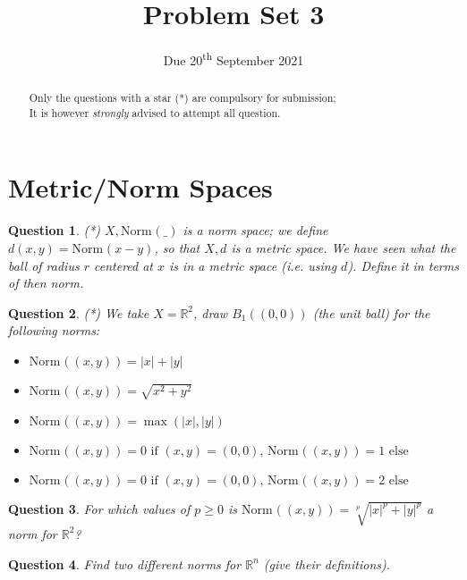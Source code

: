 \documentclass[]{article}
\title{Problem Set 3}
\author{}
\date{Due 20\textsuperscript{th} September 2021}
\newtheorem{question}{Question}
\newcommand{\R}{\mathbb{R}}
\newcommand{\norm}[2][]{\text{Norm}_{#1}(#2)}
\newcommand{\abs}[1]{| #1 |}
\begin{document}
\maketitle

\begin{abstract}
	Only the questions with a star (*) are compulsory for submission;\\
	It is however \textit{strongly} advised to attempt all question.
\end{abstract}

\section{Metric/Norm Spaces}
\begin{question}
	(*) $X,\norm{\_}$ is a norm space; we define $d(x,y)=\norm{x-y}$, so that $X,d$ is a metric space.
	We have seen what the ball of radius $r$ centered at $x$ is in a metric space (i.e. using $d$).
	Define it in terms of then norm.
\end{question}

\begin{question}
	(*) We take $X=\R^2$, draw $B_1((0,0))$ (the unit ball) for the following norms:
	\begin{itemize}
		\item $\norm{(x,y)}=\abs{x}+\abs{y}$
		\item $\norm{(x,y)}=\sqrt{x^2+y^2}$
		\item $\norm{(x,y)}=\max(\abs{x},\abs{y})$
		\item $\norm{(x,y)}=0 \text{ if } (x,y)=(0,0) \text{, } \norm{(x,y)}=1 \text{ else}$
		\item $\norm{(x,y)}=0 \text{ if } (x,y)=(0,0) \text{, } \norm{(x,y)}=2 \text{ else}$
	\end{itemize}
\end{question}
\begin{question}
	For which values of $p\geq 0$ is $\norm{(x,y)}=\sqrt[p]{\abs{x}^p+\abs{y}^p}$ a norm for $\R^2$?
\end{question}
\begin{question}
	Find two different norms for $\R^n$ (give their definitions).
\end{question}
\end{document}

